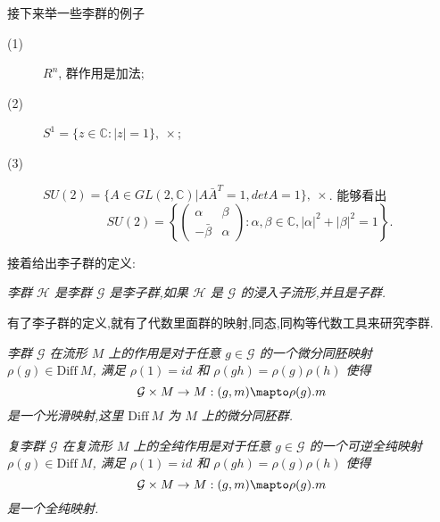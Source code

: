 
接下来举一些李群的例子
\begin{description}
	\item[(1)] $R^n$, 群作用是加法;
	\item[(2)] $S^1=\{z\in \mathbb{C}:|z|=1 \},~\times$;
	\item[(3)] $SU(2)=\{A \in GL(2,\mathbb{C})|A\bar{A}^T=1,det A = 1\},~\times$. 能够看出
	\begin{equation*}
		SU(2)=\left\lbrace\begin{pmatrix}
			\alpha&\beta\\
			-\bar{\beta}&\alpha
		\end{pmatrix}:\alpha,\beta\in\mathbb{C},|\alpha|^2+|\beta|^2 = 1
		 \right\rbrace.
	\end{equation*}
\end{description}

接着给出李子群的定义:
\begin{definition}[李子群]
	\emph{李群 $\mathcal{H}$ 是李群 $\mathcal{G}$ 是李子群,如果 $\mathcal{H}$ 是 $\mathcal{G}$ 的浸入子流形,并且是子群.}
\end{definition}

有了李子群的定义,就有了代数里面群的映射,同态,同构等代数工具来研究李群.

\begin{definition}[李群在流形上的作用]
	\emph{李群 $\mathcal{G}$ 在流形 $M$ 上的作用是对于任意 $g\in \mathcal{G}$ 的一个微分同胚映射 $\rho(g) \in \mathrm{Diff}~M$, 满足 $\rho(1) = id$ 和 $\rho(gh)=\rho(g)\rho(h)$ 使得
	\begin{equation*}
        \mathcal{G} \times M \to M : (g, m) \mapto \rho(g).m
	\end{equation*}
	是一个光滑映射,这里 $\mathrm{Diff}~M$ 为 $M$ 上的微分同胚群.}
\end{definition}

\begin{definition}[复李群在复流形上的全纯作用]
	\emph{复李群 $\mathcal{G}$ 在复流形 $M$ 上的全纯作用是对于任意 $g\in \mathcal{G}$ 的一个可逆全纯映射 $\rho(g) \in \mathrm{Diff}~M$, 满足 $\rho(1) = id$ 和 $\rho(gh)=\rho(g)\rho(h)$ 使得
	\begin{equation*}
        \mathcal{G} \times M \to M : (g, m) \mapto \rho(g).m
	\end{equation*}
	是一个全纯映射.}
\end{definition}

